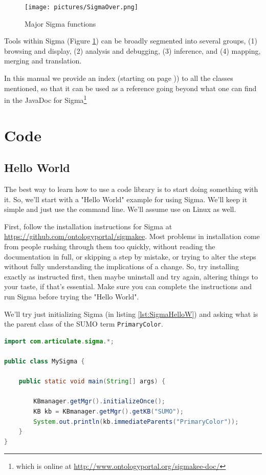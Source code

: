 \documentclass{book}
\begin{document}
\begin{figure}
  \centering
  \texttt{[image: pictures/SigmaOver.png]}
  \caption{Major Sigma functions}
  \label{fig:SigmaOver}
\end{figure}

Tools within Sigma (Figure \ref{fig:SigmaOver}) can be broadly segmented into
several groups, (1) browsing and display, (2) analysis and debugging, (3)
inference, and (4) mapping, merging and translation.  

In this manual we provide an index (starting on page \pageref{classindex})) to
all the classes mentioned, so that it can be used as a reference going beyond
what one can find in the JavaDoc for Sigma\footnote{which is online at
\url{http://www.ontologyportal.org/sigmakee-doc/}}

\chapter{Code}

\section{Hello World}

The best way to learn how to use a code library is to start doing something with it. So,
we'll start with a "Hello World" example for using Sigma.  We'll keep it simple and just 
use the command line.  We'll assume use on Linux as well.

First, follow the installation instructions for Sigma at
\url{https://github.com/ontologyportal/sigmakee}. Most problems in installation
come from people rushing through them too quickly, without reading the
documentation in full, or skipping a step by mistake, or trying to alter the
steps without fully understanding the implications of a change.  So, try
installing exactly as instructed first, then maybe uninstall and try again,
altering things to your taste, if that's essential.  Make sure you can complete the
instructions and run Sigma before trying the "Hello World".

We'll try just initializing Sigma (in listing \ref{lst:SigmaHelloW}) and asking what is the parent class of the
SUMO term \texttt{PrimaryColor}.

\begin{lstlisting}[language=java, basicstyle=\ttfamily\small\bfseries, caption=
Simplest Java call to Sigma", label=lst:SigmaHelloW]
import com.articulate.sigma.*;

public class MySigma {

    public static void main(String[] args) {

        KBmanager.getMgr().initializeOnce();
        KB kb = KBmanager.getMgr().getKB("SUMO");
        System.out.println(kb.immediateParents("PrimaryColor"));
    }
}
\end{lstlisting}
\end{document}
